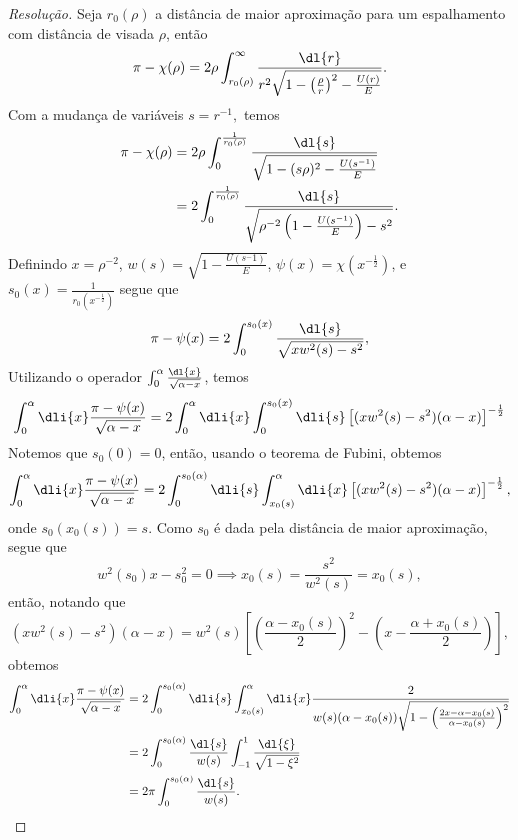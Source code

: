 \begin{proof}[Resolução]
    Seja \(r_0(\rho)\) a distância de maior aproximação para um espalhamento com distância de visada \(\rho\), então
    \begin{equation*}
        \pi - \chi(\rho) = 2 \rho \int_{r_0(\rho)}^\infty \frac{\dl{r}}{r^2\sqrt{1 - \left(\frac{\rho}{r}\right)^2 - \frac{U(r)}{E}}}.
    \end{equation*}
    Com a mudança de variáveis \(s = r^{-1},\) temos
    \begin{align*}
        \pi - \chi(\rho) &= 2\rho \int_{0}^{\frac1{r_0(\rho)}}\frac{\dl{s}}{\sqrt{1 - (s\rho)^2 - \frac{U(s^{-1})}{E}}}\\
                         &= 2 \int_{0}^{\frac1{r_0(\rho)}} \frac{\dl{s}}{\sqrt{\rho^{-2}\left(1 - \frac{U(s^{-1})}{E}\right) - s^2}}.
    \end{align*}
    Definindo \(x = \rho^{-2}\), \(w(s) = \sqrt{1 - \frac{U(s^-1)}{E}}\), \(\psi(x) = \chi\left(x^{-\frac12}\right)\), e \(s_0(x) = \frac{1}{r_0\left(x^{-\frac12}\right)}\) segue que
    \begin{equation*}
        \pi - \psi(x) = 2\int_{0}^{s_0(x)} \frac{\dl{s}}{\sqrt{x w^2(s) - s^2}},
    \end{equation*}
    Utilizando o operador \(\int_{0}^{\alpha} \frac{\dl{x}}{\sqrt{\alpha - x}}\), temos
    \begin{equation*}
        \int_{0}^\alpha \dli{x}\frac{\pi - \psi(x)}{\sqrt{\alpha - x}} = 2\int_0^\alpha \dli{x} \int_{0}^{s_0(x)} \dli{s} \left[(xw^2(s) - s^2)(\alpha - x)\right]^{-\frac12}
    \end{equation*}
    Notemos que \(s_0(0) = 0\), então, usando o teorema de Fubini, obtemos
    \begin{equation*}
        \int_{0}^\alpha \dli{x} \frac{\pi - \psi(x)}{\sqrt{\alpha - x}} = 2\int_{0}^{s_0(\alpha)} \dli{s} \int_{x_0(s)}^\alpha \dli{x}\left[(xw^2(s) - s^2)(\alpha - x)\right]^{-\frac12},
    \end{equation*}
    onde \(s_0(x_0(s)) = s\). Como \(s_0\) é dada pela distância de maior aproximação, segue que
    \begin{equation*}
        w^2(s_0) x - s_0^2 = 0 \implies x_0(s) = \frac{s^2}{w^2(s)} = x_0(s),
    \end{equation*}
    então, notando que
    \begin{equation*}
        (xw^2(s) - s^2)(\alpha - x) = w^2(s)\left[\left(\frac{\alpha - x_0(s)}{2}\right)^2 - \left(x - \frac{\alpha + x_0(s)}{2}\right)\right],
    \end{equation*}
    obtemos
    \begin{align*}
        \int_0^\alpha \dli{x}\frac{\pi - \psi(x)}{\sqrt{\alpha - x}} &= 2\int_{0}^{s_0(\alpha)} \dli{s} \int_{x_0(s)}^\alpha\dli{x} \frac{2}{w(s)(\alpha - x_0(s))\sqrt{1 - \left(\frac{2x - \alpha - x_0(s)}{\alpha -x_0(s)}\right)^2}}\\
                                                                     &= 2\int_0^{s_0(\alpha)} \frac{\dl{s}}{w(s)} \int_{-1}^{1} \frac{\dl{\xi}}{\sqrt{1 - \xi^2}}\\
                                                                     &= 2\pi \int_0^{s_0(\alpha)} \frac{\dl{s}}{w(s)}.
    \end{align*}


\end{proof}

